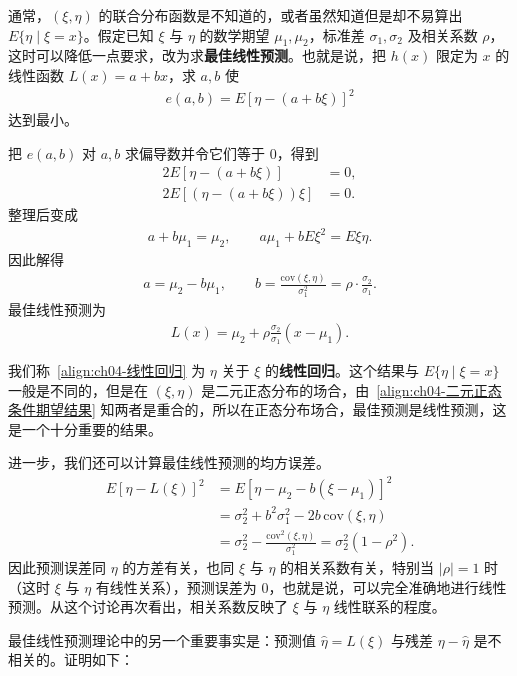 \documentclass[../../main.tex]{subfiles}
\begin{document}
通常，$(\xi,\eta)$ 的联合分布函数是不知道的，或者虽然知道但是却不易算出 $E\{\eta\mid\xi=x\}$。假定已知 $\xi$ 与 $\eta$ 的数学期望 $\mu_1,\mu_2$，标准差 $\sigma_1,\sigma_2$ 及相关系数 $\rho$，这时可以降低一点要求，改为求\textbf{最佳线性预测}。也就是说，把 $h(x)$ 限定为 $x$ 的线性函数 $L(x)=a+bx$，求 $a,b$ 使
\begin{align}
e(a,b)=E[\eta-(a+b\xi)]^2\label{align:ch04-最佳线性预测}
\end{align}
达到最小。

把 $e(a,b)$ 对 $a,b$ 求偏导数并令它们等于 $0$，得到
\begin{align*}
2E[\eta-(a+b\xi)]&=0,\\
2E[(\eta-(a+b\xi))\xi]&=0.
\end{align*}
整理后变成
\begin{align}
a+b\mu_1=\mu_2,\qquad a\mu_1+bE\xi^2=E\xi\eta.\label{align:ch04-最佳线性预测正规方程}
\end{align}
因此解得
\begin{align}
a=\mu_2-b\mu_1,\qquad b=\frac{\mathrm{cov}(\xi,\eta)}{\sigma_1^2}=\rho\cdot\frac{\sigma_2}{\sigma_1}.\label{align:ch04-最佳线性预测系数}
\end{align}
最佳线性预测为
\begin{align}
L(x)=\mu_2+\rho\frac{\sigma_2}{\sigma_1}(x-\mu_1).\label{align:ch04-线性回归}
\end{align}

我们称~\eqref{align:ch04-线性回归} 为 $\eta$ 关于 $\xi$ 的\textbf{线性回归}。这个结果与 $E\{\eta\mid\xi=x\}$ 一般是不同的，但是在 $(\xi,\eta)$ 是二元正态分布的场合，由~\eqref{align:ch04-二元正态条件期望结果} 知两者是重合的，所以在正态分布场合，最佳预测是线性预测，这是一个十分重要的结果。

进一步，我们还可以计算最佳线性预测的均方误差。
\begin{align}
E[\eta-L(\xi)]^2
&=E[\eta-\mu_2-b(\xi-\mu_1)]^2\nonumber\\
&=\sigma_2^2+b^2\sigma_1^2-2b\,\mathrm{cov}(\xi,\eta)\nonumber\\
&=\sigma_2^2-\frac{\mathrm{cov}^2(\xi,\eta)}{\sigma_1^2}=\sigma_2^2(1-\rho^2).\label{align:ch04-最佳线性预测均方误差}
\end{align}
因此预测误差同 $\eta$ 的方差有关，也同 $\xi$ 与 $\eta$ 的相关系数有关，特别当 $|\rho|=1$ 时（这时 $\xi$ 与 $\eta$ 有线性关系），预测误差为 $0$，也就是说，可以完全准确地进行线性预测。从这个讨论再次看出，相关系数反映了 $\xi$ 与 $\eta$ 线性联系的程度。

最佳线性预测理论中的另一个重要事实是：预测值 $\hat{\eta}=L(\xi)$ 与残差 $\eta-\hat{\eta}$ 是不相关的。证明如下：
\end{document}

